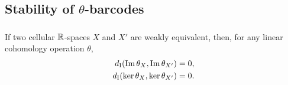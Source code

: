 \subsection{Stability of $\theta$-barcodes}\label{ss:stability}




%
%

\subsubsection{}\label{lem:w.h.e. preservance}
\lemma If two cellular $\mathbb{R}$-spaces $X$ and $X'$ are weakly equivalent, then, for any linear cohomology operation $\theta$,
\[
\begin{split}
	d_{\mathrm{I}}(\operatorname{Im}\theta_{X}, \operatorname{Im}\theta_{X'}) &= 0, \\
	d_{\mathrm{I}}(\ker\theta_{X}, \ker\theta_{X'}) &= 0.
\end{split}
\]

